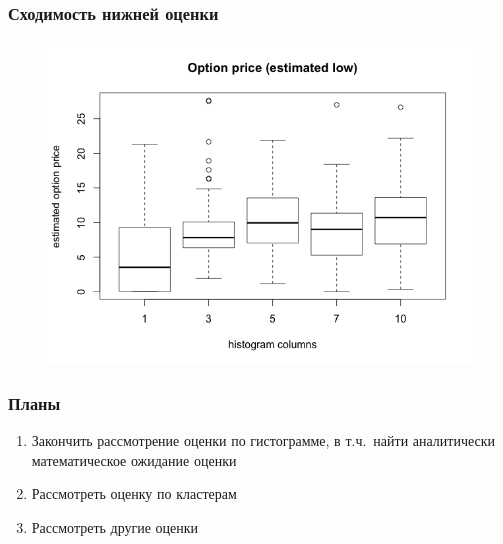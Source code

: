 \documentclass[unicode, notheorems]{beamer}
\begin{document}
  \begin{frame}
    \frametitle{Сходимость нижней оценки}
      \begin{figure}[h]
        \includegraphics[width=\linewidth, height=0.8\paperheight]{lower_estimate}
      \end{figure} 
  \end{frame}

  \begin{frame}
    \frametitle{Планы}
    \begin{enumerate}
    \item Закончить рассмотрение оценки по гистограмме, в т.ч.\ найти аналитически математическое ожидание оценки
    \item Рассмотреть оценку по кластерам
    \item Рассмотреть другие оценки
  \end{enumerate} 
  \end{frame}
\end{document}
